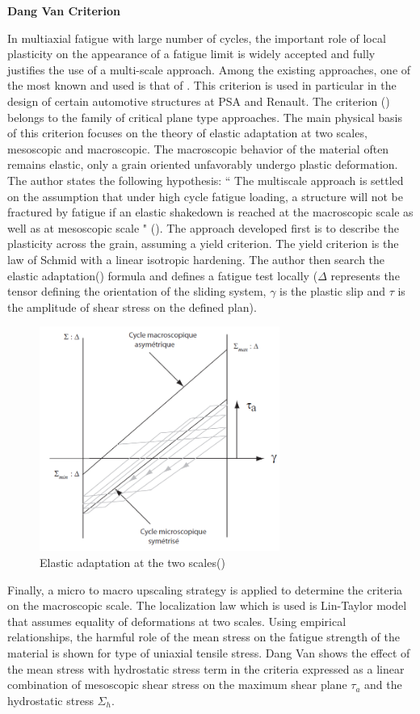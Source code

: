 \textbf{Dang Van Criterion}

In multiaxial fatigue with large number of cycles, the important role of local plasticity on the appearance of a fatigue limit is widely accepted and fully justifies the use of a multi-scale approach. Among the existing approaches, one of the most known and used is that of \cite{van1999introduction}. This criterion is used in particular in the design of certain automotive structures at PSA and
Renault. The criterion (\cite{van1986criterion}) belongs to the family of critical plane type approaches. The main physical
basis of this criterion focuses on the theory of elastic adaptation at two scales, mesoscopic and macroscopic. The macroscopic behavior of the material often remains elastic, only a grain oriented unfavorably undergo
plastic deformation. The author states the following hypothesis: `` The
multiscale approach is settled on the assumption that under high cycle fatigue loading, a structure
will not be fractured by fatigue if an elastic shakedown is reached at the macroscopic scale as well
as at mesoscopic scale " (\cite{van1999introduction}). The approach developed first is
to describe the plasticity across the grain, assuming a yield criterion. The yield criterion is the law of Schmid with a
linear isotropic hardening. The author then search the elastic adaptation() formula and defines a fatigue
test locally ($\Delta$ represents the tensor defining the orientation of the sliding system, $\gamma$ is the plastic slip  and $\tau$
is the amplitude of shear stress on the defined plan).
\begin{figure}[!h]
	\centering
	\includegraphics[width=0.7\textwidth]{figures//DV.png} 
	\caption{Elastic adaptation at the two scales(\cite{van1999introduction})}
	\label{figDV}
\end{figure}
Finally, a micro to macro upscaling strategy is applied to determine the criteria on the macroscopic scale. The localization law which is used is Lin-Taylor model that assumes equality of deformations at two scales. Using empirical relationships, the harmful role of the mean stress on the fatigue strength of the material is shown for type of uniaxial tensile stress. Dang Van shows the effect of the mean stress with  hydrostatic stress term in the criteria expressed as a linear combination of mesoscopic  shear stress on the maximum shear plane $\tau_a$ and the hydrostatic stress $\Sigma_h$.



